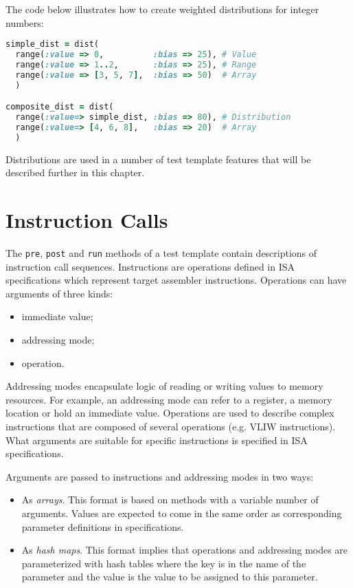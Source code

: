 \documentclass[oneside,final,12pt]{extreport}
\begin{document}
The code below illustrates how to create weighted distributions for integer numbers:

\begin{lstlisting}[language=ruby]
simple_dist = dist(
  range(:value => 0,          :bias => 25), # Value
  range(:value => 1..2,       :bias => 25), # Range
  range(:value => [3, 5, 7],  :bias => 50)  # Array
  )

composite_dist = dist(
  range(:value=> simple_dist, :bias => 80), # Distribution
  range(:value=> [4, 6, 8],   :bias => 20)  # Array
  )
\end{lstlisting} 

Distributions are used in a number of test template features that will be described
further in this chapter.


\section{Instruction Calls}

The \texttt{pre}, \texttt{post} and \texttt{run} methods of a test template contain
descriptions of instruction call sequences. Instructions are operations defined
in ISA specifications which represent target assembler instructions. Operations can
have arguments of three kinds:

\begin{itemize}
\item immediate value;
\item addressing mode;
\item operation.
\end{itemize}

Addressing modes encapsulate logic of reading or writing values to memory resources.
For example, an addressing mode can refer to a register, a memory location or hold
an immediate value. Operations are used to describe complex instructions that are
composed of several operations (e.g. VLIW instructions). What arguments are suitable
for specific instructions is specified in ISA specifications.

Arguments are passed to instructions and addressing modes in two ways:
\begin{itemize}
\item As \emph{arrays}. This format is based on methods with a variable number of arguments.
      Values are expected to come in the same order as corresponding parameter definitions
      in specifications. 

\item As \emph{hash maps}. This format implies that operations and addressing modes are
      parameterized with hash tables where the key is in the name of the parameter
      and the value is the value to be assigned to this parameter.
\end{itemize}
\end{document}
